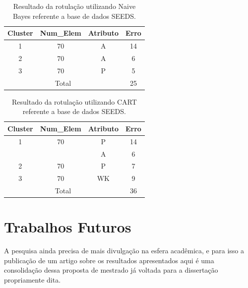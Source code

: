 \begin{table}[]
\centering
\caption{Resultado da rotulação utilizando Naive Bayes  referente a base de dados SEEDS.}
\label{tab:resultado:seeds:nb}
\begin{tabular}{|c|c|c|c|}
\hline
\rowcolor[HTML]{EFEFEF} 
Cluster             & Num\_Elem             & Atributo & Erro \\ \hline
1                   &    70                & A        & 14    \\ \hline
2                   &   70                 & A        & 6   \\ \hline 
3 &                     70                 & P        & 5   \\ \hline
\multicolumn{3}{|c|}{Total}                           & 25   \\ \hline
\end{tabular}
\end{table}

\begin{table}[]
\centering
\caption{Resultado da rotulação utilizando CART  referente a base de dados SEEDS.}
\label{tab:resultado:seeds:cart}
\begin{tabular}{|c|c|c|c|}
\hline
\rowcolor[HTML]{EFEFEF} 
Cluster             & Num\_Elem             & Atributo & Erro \\ \hline
1                   &    70                & P        & 14    \\ \hline
                    &                    & A        & 6   \\  \cline{3-4}
\multirow{-2}{*}{2} &   \multirow{-2}{*}{70}                 & P        & 7   \\ \hline 
3 &                     70                 & WK        & 9   \\ \hline
\multicolumn{3}{|c|}{Total}                           & 36   \\ \hline
\end{tabular}
\end{table}

\section{Trabalhos Futuros}\label{cap:fut}

A pesquisa ainda precisa de mais divulgação na esfera acadêmica, e para isso a publicação de um artigo sobre os resultados apresentados aqui é uma consolidação dessa proposta de mestrado já voltada para a dissertação propriamente dita.


